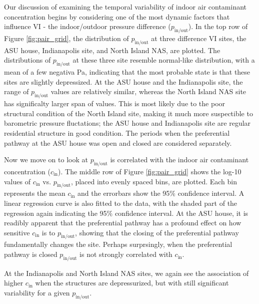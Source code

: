 \documentclass[journal=esthag,manuscript=article]{achemso}
\begin{document}
Our discussion of examining the temporal variability of indoor air contaminant concentration begins by considering one of the most dynamic factors that influence VI - the indoor/outdoor pressure difference ($p_\mathrm{in/out}$).
In the top row of Figure \ref{fig:pair_grid}, the distribution of $p_\mathrm{in/out}$ at three difference VI sites, the ASU house, Indianapolis site, and North Island NAS, are plotted.
The distributions of $p_\mathrm{in/out}$ at these three site resemble normal-like distribution, with a mean of a few negativa Pa, indicating that the most probable state is that these sites are slightly depressized.
At the ASU house and the Indianapolis site, the range of $p_\mathrm{in/out}$ values are relatively similar, whereas the North Island NAS site has significalty larger span of values.
This is most likely due to the poor structural condition of the North Island site, making it much more suspectible to barometric pressure fluctations; the ASU house and Indianapolis site are regular residential structure in good condition.
The periods when the preferential pathway at the ASU house was open and closed are considered separately.

Now we move on to look at $p_\mathrm{in/out}$ is correlated with the indoor air contaminant concentration ($c_\mathrm{in}$).
The middle row of Figure \ref{fig:pair_grid} shows the log-10 values of $c_\mathrm{in}$ vs. $p_\mathrm{in/out}$, placed into evenly spaced bins, are plotted.
Each bin represents the mean $c_\mathrm{in}$ and the errorbars show the 95\% confidence interval. %
A linear regression curve is also fitted to the data, with the shaded part of the regression again indicating the 95\% confidence interval. %
At the ASU house, it is readibly apparent that the preferential pathway has a profound effect on how sensitive $c_\mathrm{in}$ is to $p_\mathrm{in/out}$, showing that the closing of the preferential pathway fundamentally changes the site.
Perhaps surprsingly, when the preferential pathway is closed $p_\mathrm{in/out}$ is not strongly correlated with $c_\mathrm{in}$.

At the Indianapolis and North Island NAS sites, we again see the association of higher $c_\mathrm{in}$ when the structures are depressurized, but with still significant variability for a given $p_\mathrm{in/out}$.
\end{document}

